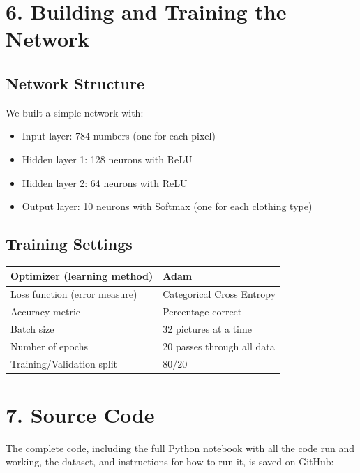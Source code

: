 \documentclass[11pt]{article}
\begin{document}
\section*{6. Building and Training the Network}

\subsection*{Network Structure}

We built a simple network with:
\begin{itemize}[leftmargin=*]
\item Input layer: 784 numbers (one for each pixel)
\item Hidden layer 1: 128 neurons with ReLU
\item Hidden layer 2: 64 neurons with ReLU
\item Output layer: 10 neurons with Softmax (one for each clothing type)
\end{itemize}

\subsection*{Training Settings}

\begin{center}
\begin{tabular}{|l|l|}
\hline
Optimizer (learning method) & Adam\\ \hline
Loss function (error measure) & Categorical Cross Entropy\\ \hline
Accuracy metric & Percentage correct\\ \hline
Batch size & 32 pictures at a time\\ \hline
Number of epochs & 20 passes through all data\\ \hline
Training/Validation split & 80/20\\ \hline
\end{tabular}
\end{center}

\section*{7. Source Code}

The complete code, including the full Python notebook with all the code run and working, the dataset, and instructions for how to run it, is saved on GitHub:
\end{document}
